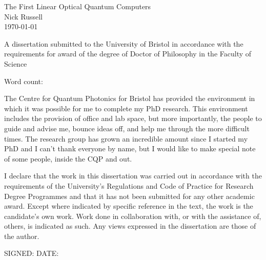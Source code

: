 \begin{titlepage}
  \begin{center}
    {\LARGE The First Linear Optical Quantum Computers}\\[1.5cm]
    {\Large Nick Russell}\\[1.5cm]
    {\today}\\[12.0cm]
  \end{center}
  \begin{flushleft}
    {A dissertation submitted to the University of Bristol in accordance with
    the requirements for award of the degree of Doctor of Philosophy in the
    Faculty of Science}
  \end{flushleft}
  \begin{flushright}
    Word count: 
  \end{flushright}
\end{titlepage}

\begin{abstract}
  Each copy must include an abstract or summary of the dissertation in not more
  than 300 words, on one side of A4, which should be single-spaced in a font
  size in the range 10 to 12.
\end{abstract}

\begin{acknowledgements}
  The Centre for Quantum Photonics for Bristol has provided the environment in
  which it was possible for me to complete my PhD research. This environment
  includes the provision of office and lab space, but more importantly, the
  people to guide and advise me, bounce ideas off, and help me through the more
  difficult times. The research group has grown an incredible amount since I
  started my PhD and I can't thank everyone by name, but I would like to make
  special note of some people, inside the CQP and out.
\end{acknowledgements}

\begin{declaration}
  I declare that the work in this dissertation was carried out in accordance
  with the requirements of the University's Regulations and Code of Practice for
  Research Degree Programmes and that it has not been submitted for any other
  academic award. Except where indicated by specific reference in the text, the
  work is the candidate's own work. Work done in collaboration with, or with the
  assistance of, others, is indicated as such. Any views expressed in the
  dissertation are those of the author.

  SIGNED: \dotfill DATE: \dotfill
\end{declaration}

\tableofcontents
\listoffigures

